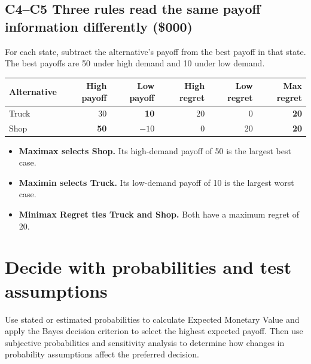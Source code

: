 \subsection*{C4--C5 \textemdash{} Three rules read the same payoff information differently (\$000)}
For each state, subtract the alternative's payoff from the best payoff in that state. The best payoffs are 50 under high demand and 10 under low demand.

{\centering\small
\begin{tabular}{@{}lrrrrr@{}}
\toprule
Alternative & High payoff & Low payoff & High regret & Low regret & Max regret\\
\midrule
Truck & 30 & \textbf{10} & 20 & 0 & \textbf{20}\\
Shop  & \textbf{50} & \(-10\) & 0 & 20 & \textbf{20}\\
\bottomrule
\end{tabular}\par}
\begin{itemize}
  \item \textbf{Maximax selects Shop.} Its high-demand payoff of 50 is the largest best case.
  \item \textbf{Maximin selects Truck.} Its low-demand payoff of 10 is the largest worst case.
  \item \textbf{Minimax Regret ties Truck and Shop.} Both have a maximum regret of 20.
\end{itemize}

\begin{criteria}
\end{criteria}

\section{Decide with probabilities and test assumptions}
Use stated or estimated probabilities to calculate Expected Monetary Value and apply the Bayes decision criterion to select the highest expected payoff. Then use subjective probabilities and sensitivity analysis to determine how changes in probability assumptions affect the preferred decision.

